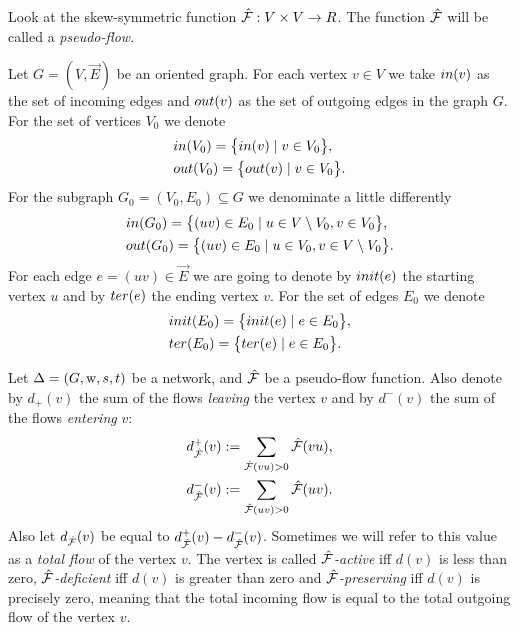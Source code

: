 \documentclass[12pt]{article}
\begin{document}
    \begin{definition}
        Look at the skew-symmetric function $\mathcal{\hat{F}}: V \times V \to R$.
        The function $\mathcal{\hat{F}}$ will be called a \emph{pseudo-flow}.
    \end{definition}
    \begin{definition}
      Let $G = (V, \vec{E})$ be an oriented graph.
      For each vertex $v \in V$ we take $in(v)$ as the set of incoming edges
      and $out(v)$ as the set of outgoing edges in the graph $G$.
      For the set of vertices $V_0$ we denote
      \begin{align*}
        &in(V_0) = \big\{in(v) \mid v\in V_0\big\},\\
        &out(V_0) = \big\{out(v) \mid v\in V_0\big\}.
      \end{align*}
      For the subgraph $G_0 = (V_0, E_0) \subseteq G$ we denominate a little differently
      \begin{align*}
        &in(G_0) = \big\{(uv)\in E_0 \mid u \in V \setminus V_0, v \in V_0\big\},\\
        &out(G_0) = \big\{(uv) \in E_0 \mid u \in V_0, v \in V\setminus V_0\big\}.
      \end{align*}
      For each edge $e=(uv) \in \vec{E}$ we are going to denote by $init(e)$ the starting vertex
      $u$ and by $ter(e)$ the ending vertex $v$.
      For the set of edges $E_0$ we denote
      \begin{align*}
        &init(E_0) = \big\{init(e) \mid e\in E_0\big\},\\
        &ter(E_0) = \big\{ter(e) \mid e\in E_0\big\}.
      \end{align*}
    \end{definition}
    \begin{definition}
      Let $\Delta = (G, \mathrm{w}, s, t)$ be a network, and $\mathcal{\hat{F}}$ be a pseudo-flow function.
      Also denote by $d_{+}(v)$ the sum of the flows \emph{leaving} the vertex $v$ and by
      $d^{-}(v)$ the sum of the flows \emph{entering} $v$:
      \begin{align*}
        &d^{+}_{\mathcal{\hat{F}}}(v) := \sum_{\mathcal{\hat{F}}(vu) > 0} \mathcal{\hat{F}}(vu),\\
        &d^{-}_{\mathcal{\hat{F}}}(v) := \sum_{\mathcal{\hat{F}}(uv) > 0} \mathcal{\hat{F}}(uv).
      \end{align*}
      Also let $d_{\mathcal{\hat{F}}}(v)$ be equal to $d^{+}_{\mathcal{\hat{F}}}(v) - d^{-}_{\mathcal{\hat{F}}}(v)$.
      Sometimes we will refer to this value as a \emph{total flow} of the vertex $v$.
      The vertex is called \emph{$\mathcal{\hat{F}}$-active} iff $d(v)$ is less than zero,
      \emph{$\mathcal{\hat{F}}$-deficient} iff $d(v)$ is greater than zero and
      \emph{$\mathcal{\hat{F}}$-preserving} iff $d(v)$ is precisely zero, meaning that the total incoming flow
      is equal to the total outgoing flow of the vertex $v$.
    \end{definition}
\end{document}
